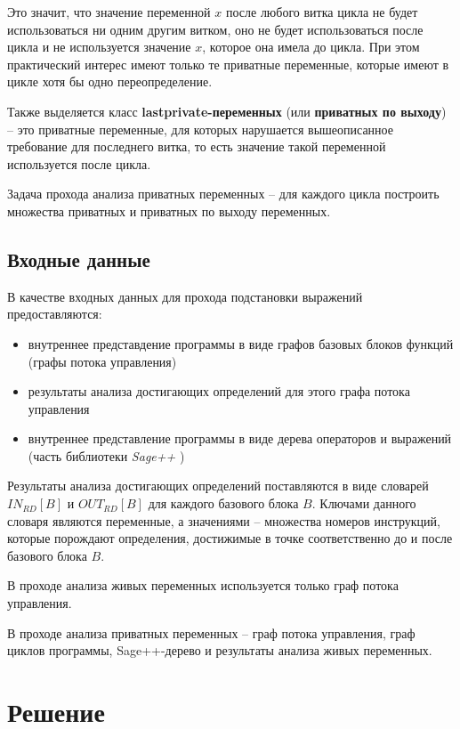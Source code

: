 \documentclass{article}
\begin{document}
Это значит, что значение переменной $x$ после любого витка цикла не будет использоваться ни одним другим витком, оно не будет использоваться после цикла и не используется значение $x$, которое она имела до цикла. При этом практический интерес имеют только те приватные переменные, которые имеют в цикле хотя бы одно переопределение.

\begin{defenition}
Также выделяется класс \textbf{lastprivate-переменных} (или \textbf{приватных по выходу}) -- это приватные переменные, для которых нарушается вышеописанное требование для последнего витка, то есть значение такой переменной используется после цикла.
\end{defenition}

Задача прохода анализа приватных переменных -- для каждого цикла построить множества приватных и приватных по выходу переменных.

\subsection{Входные данные}

В качестве входных данных для прохода подстановки выражений предоставляются:
\begin{itemize}
    \item внутреннее представдение программы в виде графов базовых блоков функций (графы потока управления)
    \item результаты анализа достигающих определений для этого графа потока управления
    \item внутреннее представление программы в виде дерева операторов и выражений (часть библиотеки \textit{Sage++} \cite{sage})
\end{itemize}




Результаты анализа достигающих определений поставляются в виде словарей $IN_{RD}[B]$ и $OUT_{RD}[B]$ для каждого базового блока $B$.
Ключами данного словаря являются переменные, а значениями -- множества номеров инструкций, которые порождают определения, 
достижимые в точке соответственно до и после базового блока $B$.


В проходе анализа живых переменных используется только граф потока управления.

В проходе анализа приватных переменных -- 
граф потока управления, граф циклов программы, Sage++-дерево \cite{sage} и результаты анализа живых переменных.

\section{Решение}
\end{document}
